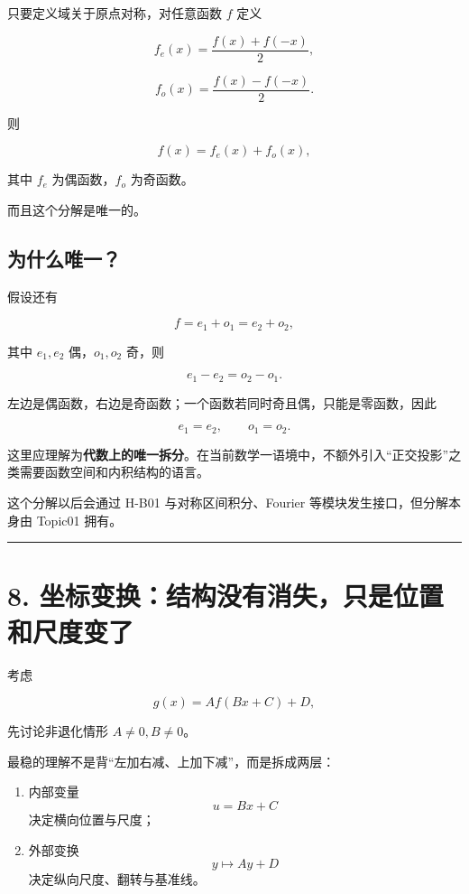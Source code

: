 \documentclass[11pt,a4paper]{ctexart}
\providecommand{\tightlist}{}
\begin{document}
只要定义域关于原点对称，对任意函数 \(f\) 定义

\[
f_e(x)=\frac{f(x)+f(-x)}2,
\]

\[
f_o(x)=\frac{f(x)-f(-x)}2.
\]

则

\[
\boxed{f(x)=f_e(x)+f_o(x)},
\]

其中 \(f_e\) 为偶函数，\(f_o\) 为奇函数。

而且这个分解是唯一的。

\subsection{为什么唯一？}\label{ux4e3aux4ec0ux4e48ux552fux4e00}

假设还有

\[
f=e_1+o_1=e_2+o_2,
\]

其中 \(e_1,e_2\) 偶，\(o_1,o_2\) 奇，则

\[
e_1-e_2=o_2-o_1.
\]

左边是偶函数，右边是奇函数；一个函数若同时奇且偶，只能是零函数，因此

\[
e_1=e_2,\qquad o_1=o_2.
\]

这里应理解为\textbf{代数上的唯一拆分}。在当前数学一语境中，不额外引入``正交投影''之类需要函数空间和内积结构的语言。

这个分解以后会通过 H-B01 与对称区间积分、Fourier
等模块发生接口，但分解本身由 Topic01 拥有。

\begin{center}\rule{0.5\linewidth}{0.5pt}\end{center}

\section{8.
坐标变换：结构没有消失，只是位置和尺度变了}\label{ux5750ux6807ux53d8ux6362ux7ed3ux6784ux6ca1ux6709ux6d88ux5931ux53eaux662fux4f4dux7f6eux548cux5c3aux5ea6ux53d8ux4e86}

考虑

\[
g(x)=A f(Bx+C)+D,
\]

先讨论非退化情形 \(A\ne0,B\ne0\)。

最稳的理解不是背``左加右减、上加下减''，而是拆成两层：

\begin{enumerate}
\def\labelenumi{\arabic{enumi}.}
\tightlist
\item
  内部变量 \[
  u=Bx+C
  \] 决定横向位置与尺度；
\item
  外部变换 \[
  y\mapsto Ay+D
  \] 决定纵向尺度、翻转与基准线。
\end{enumerate}
\end{document}
